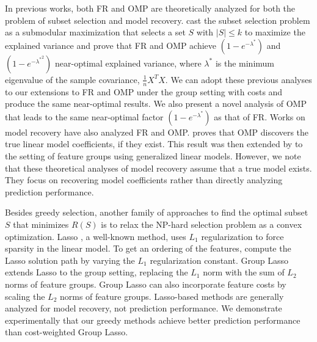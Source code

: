 In previous works, both FR and OMP are theoretically analyzed for both 
the problem of subset selection and model recovery. 
\cite{kemp} cast the subset selection problem as a submodular 
maximization that 
selects a set $S$ with $|S| \leq k$ to maximize 
the explained variance and prove 
that FR and OMP achieve $(1-e^{-\lambda^*})$ and $(1-e^{-{\lambda^*}^2})$ 
near-optimal explained variance, where $\lambda^*$ is the minimum eigenvalue of the sample covariance, $\frac{1}{n}X^TX$.
We can adopt these previous analyses to our extensions to FR and OMP under
the group setting with costs and produce
the same near-optimal results. We also present a novel analysis of 
OMP that leads to the same near-optimal factor $(1-e^{-\lambda^*})$ as that of FR.
Works on model recovery have also analyzed FR and OMP. \cite{zhang:2009} proves 
that OMP discovers the true linear model coefficients, if they exist. 
This result 
was then extended by \citep{gomp, log_gomp} to the setting of feature 
groups using generalized linear models. However, we note that these
theoretical analyses of model recovery 
assume that a true model exists. They focus on recovering
model coefficients rather than directly analyzing prediction
performance.

Besides greedy selection, another family of approaches to
find the optimal subset $S$ that minimizes $R(S)$ is to
relax the NP-hard selection problem as a convex optimization. 
Lasso \citep{lasso}, a well-known method, uses $L_1$ regularization
to force sparsity in the linear model. To get an ordering of the
features, compute the Lasso solution path by varying 
the $L_1$ regularization constant. Group Lasso \citep{group_lasso} extends Lasso to the group setting, replacing the $L_1$ norm with 
the sum of $L_2$ norms of feature groups. Group Lasso can also 
incorporate feature costs by scaling the
$L_2$ norms of feature groups. 
Lasso-based methods are generally analyzed for model recovery,  
not prediction performance. We demonstrate experimentally
that our greedy methods achieve better prediction
performance than cost-weighted Group Lasso.

